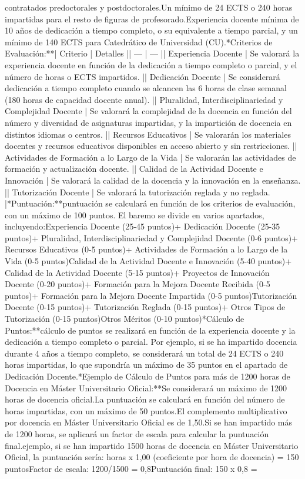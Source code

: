 \documentclass{article}
\begin{document}
\begin{itemize}
{{contratados predoctorales y postdoctorales.\n* Un mínimo de 24 ECTS o 240 horas impartidas para el resto de figuras de profesorado.\n* Experiencia docente mínima de 10 años de dedicación a tiempo completo, o su equivalente a tiempo parcial, y un mínimo de 140 ECTS para Catedrático de Universidad (CU).\n\n**Criterios de Evaluación:**\n| Criterio | Detalles |\n| --- | --- |\n| Experiencia Docente | Se valorará la experiencia docente en función de la dedicación a tiempo completo o parcial, y el número de horas o ECTS impartidos. |\n| Dedicación Docente | Se considerará dedicación a tiempo completo cuando se alcancen las 6 horas de clase semanal (180 horas de capacidad docente anual). |\n| Pluralidad, Interdisciplinariedad y Complejidad Docente | Se valorará la complejidad de la docencia en función del número y diversidad de asignaturas impartidas, y la impartición de docencia en distintos idiomas o centros. |\n| Recursos Educativos | Se valorarán los materiales docentes y recursos educativos disponibles en acceso abierto y sin restricciones. |\n| Actividades de Formación a lo Largo de la Vida | Se valorarán las actividades de formación y actualización docente. |\n| Calidad de la Actividad Docente e Innovación | Se valorará la calidad de la docencia y la innovación en la enseñanza. |\n| Tutorización Docente | Se valorará la tutorización reglada y no reglada. |\n\n**Puntuación:**\nLa puntuación se calculará en función de los criterios de evaluación, con un máximo de 100 puntos. El baremo se divide en varios apartados, incluyendo:\n\n* Experiencia Docente (25-45 puntos)\n + Dedicación Docente (25-35 puntos)\n + Pluralidad, Interdisciplinariedad y Complejidad Docente (0-6 puntos)\n + Recursos Educativos (0-5 puntos)\n + Actividades de Formación a lo Largo de la Vida (0-5 puntos)\n* Calidad de la Actividad Docente e Innovación (5-40 puntos)\n + Calidad de la Actividad Docente (5-15 puntos)\n + Proyectos de Innovación Docente (0-20 puntos)\n + Formación para la Mejora Docente Recibida (0-5 puntos)\n + Formación para la Mejora Docente Impartida (0-5 puntos)\n* Tutorización Docente (0-15 puntos)\n + Tutorización Reglada (0-15 puntos)\n + Otros Tipos de Tutorización (0-15 puntos)\n* Otros Méritos (0-10 puntos)\n\n**Cálculo de Puntos:**\nEl cálculo de puntos se realizará en función de la experiencia docente y la dedicación a tiempo completo o parcial. Por ejemplo, si se ha impartido docencia durante 4 años a tiempo completo, se considerará un total de 24 ECTS o 240 horas impartidas, lo que supondría un máximo de 35 puntos en el apartado de Dedicación Docente.\n\n**Ejemplo de Cálculo de Puntos para más de 1200 horas de Docencia en Máster Universitario Oficial:**\n\n* Se considerará un máximo de 1200 horas de docencia oficial.\n* La puntuación se calculará en función del número de horas impartidas, con un máximo de 50 puntos.\n* El complemento multiplicativo por docencia en Máster Universitario Oficial es de 1,50.\n* Si se han impartido más de 1200 horas, se aplicará un factor de escala para calcular la puntuación final.\n\nPor ejemplo, si se han impartido 1500 horas de docencia en Máster Universitario Oficial, la puntuación sería:\n{} horas x 1,00 (coeficiente por hora de docencia) = 150 puntos\n* Factor de escala: 1200/1500 = 0,8\n* Puntuación final: 150 x 0,8 = }}
\end{itemize}
\end{document}
